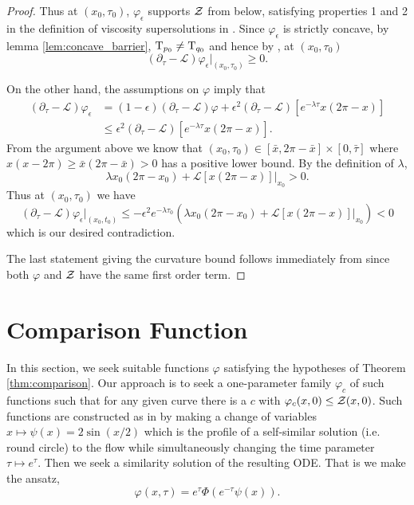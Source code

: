 \documentclass[a4paper, 12pt]{amsart}
\begin{document}
\begin{proof}
Thus at $(x_0,\tau_0)$, $\varphi_{\epsilon}$ supports \(\operatorname{\mathcal{Z}}\) from below, satisfying properties 1 and 2 in the definition of viscosity supersolutions in . Since $\varphi_{\epsilon}$ is strictly concave, by lemma \ref{lem:concave_barrier}, $\operatorname{T}_{p_0} \ne \operatorname{T}_{q_0}$ and hence by , at \((x_0, \tau_0)\)
\[
(\partial_{\tau} - \mathcal{L}) \varphi_{\epsilon}|_{(x_0, \tau_0)} \geq 0.
\]

On the other hand, the assumptions on \(\varphi\) imply that
\[
\begin{split}
(\partial_{\tau} - \mathcal{L}) \varphi_{\epsilon} &= (1-\epsilon) (\partial_{\tau} - \mathcal{L}) \varphi + \epsilon^2 (\partial_{\tau} - \mathcal{L}) [e^{-\lambda\tau} x(2\pi-x)] \\
&\leq \epsilon^2  (\partial_{\tau} - \mathcal{L}) [e^{-\lambda\tau} x(2\pi-x)].
\end{split}
\]
From the argument above we know that \((x_0, \tau_0) \in [\bar{x}, 2\pi - \bar{x}] \times [0, \bar{\tau}]\) where \(x(x-2\pi) \geq \bar{x}(2\pi - \bar{x}) > 0\) has a positive lower bound. By the definition of \(\lambda\),
\[
\lambda x_0(2\pi - x_0) + \mathcal{L} [x(2\pi-x)]|_{x_0} > 0.
\]
Thus at \((x_0, \tau_0)\) we have
\[
(\partial_{\tau} - \mathcal{L}) \varphi_{\epsilon}|_{(x_0, t_0)} \leq -\epsilon^2 e^{-\lambda \tau_0} \left(\lambda x_0(2\pi - x_0) + \mathcal{L} [x(2\pi-x)]|_{x_0}\right) < 0
\]
which is our desired contradiction.

The last statement giving the curvature bound follows immediately from  since both \(\varphi\) and \(\operatorname{\mathcal{Z}}\) have the same first order term.
\end{proof}

\section{Comparison Function}
\label{sec:comparison_function}

In this section, we seek suitable functions $\varphi$ satisfying the hypotheses of Theorem \ref{thm:comparison}. Our approach is to seek a one-parameter family $\varphi_c$ of such functions such that for any given curve there is a $c$ with $\varphi_c(x, 0) \leq \operatorname{\mathcal{Z}}(x, 0)$. Such functions are constructed as in \cite{MR2794630} by making a change of variables $x \mapsto \psi(x) = 2 \sin(x/2)$ which is the profile of a self-similar solution (i.e. round circle) to the flow while simultaneously changing the time parameter $\tau \mapsto e^{\tau}$. Then we seek a similarity solution of the resulting ODE. That is we make the ansatz,
\[
\varphi(x, \tau) = e^{\tau} \Phi(e^{-\tau} \psi(x)).
\]
\end{document}

